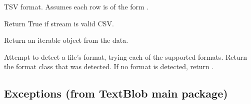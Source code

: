 \documentclass[letterpaper,10pt,english]{sphinxmanual}
\begin{document}
\begin{fulllineitems}
\label{api_reference:textblob.formats.TSV}
TSV format. Assumes each row is of the form .

\begin{fulllineitems}
\label{api_reference:textblob.formats.TSV.detect}
Return True if stream is valid CSV.

\end{fulllineitems}


\begin{fulllineitems}
\label{api_reference:textblob.formats.TSV.to_iterable}
Return an iterable object from the data.

\end{fulllineitems}


\end{fulllineitems}


\begin{fulllineitems}
\label{api_reference:textblob.formats.detect}
Attempt to detect a file's format, trying each of the supported
formats. Return the format class that was detected. If no format is
detected, return .

\end{fulllineitems}



\subsection{Exceptions (from TextBlob main package)}
\label{api_reference:module-textblob.exceptions}\label{api_reference:exceptions-from-textblob-main-package}
\end{document}
